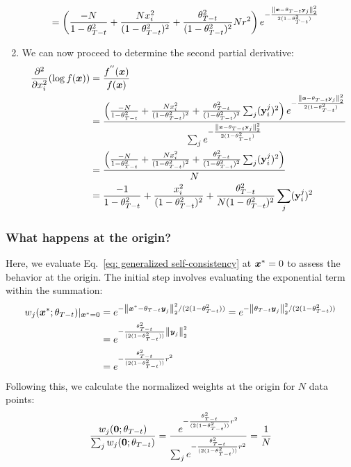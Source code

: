 \begin{enumerate}
\begin{align}
       &=    \left(\frac{-N}{1 - \theta_{T-t}^2}  +
        \frac{N x_i^2}{(1 - \theta_{T-t}^2)^2}+
        \frac{\theta_{T - t}^2}{(1 - \theta_{T-t}^2)^2} N r^2 \right) e^{-\frac{{\left\lVert\boldsymbol{x} - \theta_{T - t}\mathbf{y}_j\right\rVert}_{2}^2}{2 ( 1 - \theta_{T-t}^2)}}
\end{align}
\item  We can now proceed to determine the second partial derivative:
   \begin{align}
        \frac{\partial^2}{\partial x_i^2} (\log f(\boldsymbol{x})) &=  \frac{f^{''}(\boldsymbol{x})}{f(\boldsymbol{x})} \nonumber\\
        &= \frac{  \left(\frac{-N}{1 - \theta_{T-t}^2}  +
        \frac{N x_i^2}{(1 - \theta_{T-t}^2)^2}+
        \frac{\theta_{T - t}^2}{(1 - \theta_{T-t}^2)^2}  \sum_j(\mathbf{y}_i^j)^2 \right) e^{-\frac{{\left\lVert\boldsymbol{x} - \theta_{T - t}\mathbf{y}_j\right\rVert}_{2}^2}{2 ( 1 - \theta_{T-t}^2)}} }{\sum_j e^{-\frac{{\left\lVert\boldsymbol{x} - \theta_{T - t}\mathbf{y}_j\right\rVert}_{2}^2}{2 ( 1 - \theta_{T-t}^2)}}}\nonumber\\
        &= \frac{  \left(\frac{-N}{1 - \theta_{T-t}^2}  +
        \frac{N x_i^2}{(1 - \theta_{T-t}^2)^2}+
        \frac{\theta_{T - t}^2}{(1 - \theta_{T-t}^2)^2}  \sum_j(\mathbf{y}_i^j)^2  \right) }{N}\nonumber\\
        &= \frac{-1}{1 - \theta_{T-t}^2}  +
        \frac{x_i^2}{(1 - \theta_{T-t}^2)^2}+
        \frac{\theta_{T - t}^2}{N(1 - \theta_{T-t}^2)^2}  \sum_j(\mathbf{y}_i^j)^2
   \end{align}
\end{enumerate}

\subsubsection{What happens at the origin?}

Here, we evaluate Eq.~\ref{eq: generalized self-consistency} at $\boldsymbol{x}^{*}=0$ to assess the behavior at the origin. The initial step involves evaluating the exponential term within the summation:
\begin{align}
    w_j(\boldsymbol{x}^*; \theta_{T - t})|_{\boldsymbol{x}^*=0} &= e^{-{\left\lVert\boldsymbol{x}^* - \theta_{T - t} \boldsymbol{y}_j\right\rVert}_{2}^2/(2(1 - \theta_{T - t}^2))}= e^{-{\left\lVert\theta_{T - t} \boldsymbol{y}_j\right\rVert}_{2}^2/(2(1 - \theta_{T - t}^2))} \nonumber\\
    &= e^{-\frac{\theta_{T - t}^2}{(2(1 - \theta_{T - t}^2))}{\left\lVert \boldsymbol{y}_j\right\rVert}_{2}^2}\nonumber\\
    &= e^{-\frac{\theta_{T - t}^2}{(2(1 - \theta_{T - t}^2))}r^2}
\end{align}
Following this, we calculate the normalized weights at the origin for $N$ data points:
\begin{equation}
    \frac{w_j(\boldsymbol{0}; \theta_{T - t})}{\sum_j w_j(\boldsymbol{0}; \theta_{T - t})} = \frac{e^{-\frac{\theta_{T - t}^2}{(2(1 - \theta_{T - t}^2))}r^2}}{\sum_je^{-\frac{ \theta_{T - t}^2}{(2(1 - \theta_{T - t}^2))}r^2}} = \frac{1}{N}
\end{equation}

